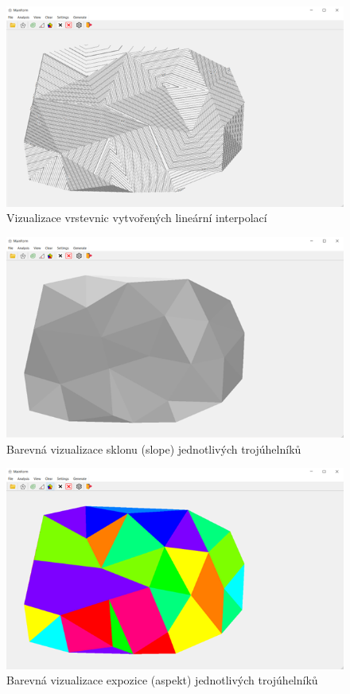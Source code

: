 \begin{figure}[H]
    \centering
    \includegraphics[width=\textwidth]{images/Ukazka_contourlines.png}
    \caption{Vizualizace vrstevnic vytvořených lineární interpolací}
\end{figure}

\begin{figure}[H]
    \centering
    \includegraphics[width=\textwidth]{images/Ukazka_slope.png}
    \caption{Barevná vizualizace sklonu (slope) jednotlivých trojúhelníků}
\end{figure}

\begin{figure}[H]
    \centering
    \includegraphics[width=\textwidth]{images/Ukazka_aspect.png}
    \caption{Barevná vizualizace expozice (aspekt) jednotlivých trojúhelníků}
\end{figure}

